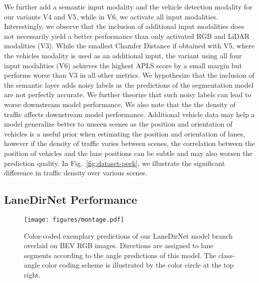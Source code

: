 \documentclass[letterpaper, 10 pt, conference]{ieeeconf}
\begin{document}
We further add a semantic input modality and the vehicle detection modality for our variants V4 and V5, while in V6, we activate all input modalities. Interestingly, we observe that the inclusion of additional input modalities does not necessarily yield a better performance than only activated RGB and LiDAR modalities (V3). While the smallest Chamfer Distance if obtained with V5, where the vehicles modality is used as an additional input, the variant using all four input modalities (V6) achieves the highest APLS score by a small margin but performs worse than V3 in all other metrics. We hypothesize that the inclusion of the semantic layer adds noisy labels as the predictions of the segmentation model are not perfectly accurate. We further theorize that such noisy labels can lead to worse downstream model performance. We also note that the the density of traffic affects downstream model performance. Additional vehicle data may help a model generalize better to unseen scenes as the position and orientation of vehicles is a useful prior when estimating the position and orientation of lanes, however if the density of traffic varies between scenes, the correlation between the position of vehicles and the lane positions can be subtle and may also worsen the prediction quality. In Fig.~\ref{fig:dataset-peek}, we illustrate the significant difference in traffic density over various scenes.



\subsection{LaneDirNet Performance}



\begin{figure}
\centering
\texttt{[image: figures/montage.pdf]}
    \caption{Color-coded exemplary predictions of our LaneDirNet model branch overlaid on BEV RGB images. Directions are assigned to lane segments according to the angle predictions of this model. The class-angle color coding scheme is illustrated by the color circle at the top right.}
    \label{fig:lanedirnet} 
\end{figure}
\end{document}
